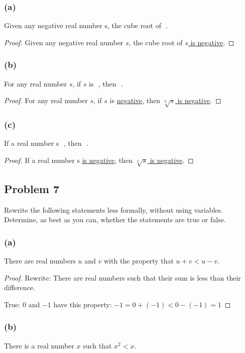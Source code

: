 \documentclass[14pt]{extarticle}
\newcommand{\fbl}{\underline{\hspace{1cm}}\,\,}
\begin{document}
\subsubsection{(a)}
Given any negative real number s, the cube root of \fbl.

\begin{proof}
Given any negative real number $s$, the cube root of \underline{$s$ is negative}.
\end{proof}

\subsubsection{(b)}
For any real number $s$, if $s$ is \fbl, then \fbl.

\begin{proof}
For any real number $s$, if $s$ is \underline{negative}, then \underline{$\sqrt[3]{s}$ is negative}.
\end{proof}

\subsubsection{(c)}
If a real number s \fbl, then \fbl.

\begin{proof}
If a real number s \underline{is negative}, then \underline{$\sqrt[3]{s}$ is negative}.
\end{proof}

\subsection{Problem 7}
Rewrite the following statements less formally, without using variables. Determine, as best as you can, whether the statements are true or false.

\subsubsection{(a)}
There are real numbers $u$ and $v$ with the property that $u + v < u - v$.

\begin{proof}
Rewrite: There are real numbers such that their sum is less than their difference.

True: $0$ and $-1$ have this property: $-1 = 0 + (-1) < 0 - (-1) = 1$
\end{proof}

\subsubsection{(b)}
There is a real number $x$ such that $x^2 < x$.
\end{document}
